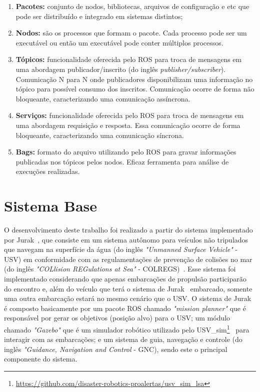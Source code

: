         \begin{enumerate}[label=\Alph*]
            \item \textbf{Pacotes:} conjunto de nodos, bibliotecas, arquivos de configuração e etc que pode ser distribuído e integrado em sistemas distintos;
            \item \textbf{Nodos:} são os processos que formam o pacote. Cada processo pode ser um executável ou então um executável pode conter múltiplos processos.
            \item \textbf{Tópicos:} funcionalidade oferecida pelo ROS para troca de mensagens em uma abordagem publicador/inscrito (do inglês \textit{publisher/subscriber}). Comunicação N para N onde publicadores disponibilizam uma informação no tópico para possível consumo dos inscritos. Comunicação ocorre de forma não bloqueante, caracterizando uma comunicação assíncrona. %
            \item \textbf{Serviços:} funcionalidade oferecida pelo ROS para troca de mensagens em uma abordagem requisição e resposta. Essa comunicação ocorre de forma bloqueante, caracterizando uma comunicação síncrona. %
            \item \textbf{Bags:} formato do arquivo utilizando pelo ROS para gravar informações publicadas nos tópicos pelos nodos. Eficaz ferramenta para análise de execuções realizadas.
        \end{enumerate}
    
        
    
    \section{Sistema Base} \label{subchap3:sistema_base}
        O desenvolvimento deste trabalho foi realizado a partir do sistema implementado por Jurak~\cite{Jurak2020COLREGS}, que consiste em um sistema autônomo para veículos não tripulados que navegam na superfície da água (do inglês \textit{"Unmanned Surface Vehicle"} - USV) em conformidade com as regulamentações de prevenção de colisões no mar (do inglês \textit{"COLlision REGulations at Sea"} - COLREGS)~\cite{COLREGS}. Esse sistema foi implementado considerando que apenas embarcações de propulsão participarão do encontro e, além do veículo que terá o sistema de Jurak~\cite{Jurak2020COLREGS} embarcado, somente uma outra embarcação estará no mesmo cenário que o USV. O sistema de Jurak~\cite{Jurak2020COLREGS} é composto basicamente por um pacote ROS chamado \textit{"mission planner"} que é responsável por gerar os objetivos (posição alvo) para o USV; um módulo chamado \textit{"Gazebo"} que é um simulador robótico utilizado pelo USV\_sim\footnote{\url{https://github.com/disaster-robotics-proalertas/usv\_sim\_lsa}}~\cite{Paravisi2018Toward} para interagir com as embarcações; e um sistema de guia, navegação e controle (do inglês \textit{"Guidance, Navigation and Control} - GNC), sendo este o principal componente do sistema.
        
